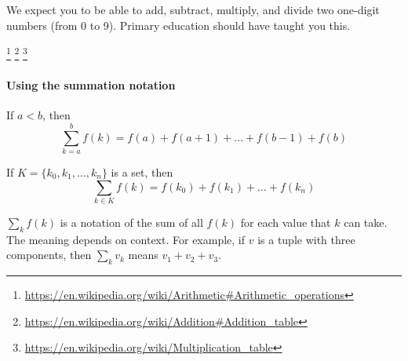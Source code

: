 We expect you to be able to add, subtract, multiply, and divide two one-digit numbers (from 0 to 9).
Primary education should have taught you this.

\footnote{\url{https://en.wikipedia.org/wiki/Arithmetic\#Arithmetic_operations}}%
\footnote{\url{https://en.wikipedia.org/wiki/Addition\#Addition_table}}%
\footnote{\url{https://en.wikipedia.org/wiki/Multiplication_table}}%

\paragraph{Using the summation notation}

If \(a < b\), then
\[
\sum_{k=a}^b f(k) = f(a) + f(a+1) + \ldots + f(b-1) + f(b)
\]

If \(K = \{ k_0, k_1, \ldots, k_n \}\) is a set, then
\[
\sum_{k \in K} f(k) = f(k_0) + f(k_1) + \ldots + f(k_n)
\]

\( \sum_k f(k) \) is a notation of the sum of all \(f(k)\) for each value that \(k\) can take. The meaning depends on context. For example, if \(v\) is a tuple with three components, then \(\sum_k v_k\) means \(v_1 + v_2 + v_3\).
